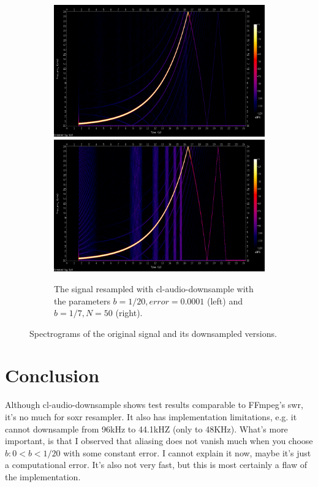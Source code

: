 \documentclass[a4paper,11pt,fleqn]{article}
\begin{document}
\begin{figure}[h!]
  \begin{subfigure}{\linewidth}
  \includegraphics[width=.4\linewidth]{accurate.png}\hfill
  \includegraphics[width=.4\linewidth]{fast.png}\hfill
  \caption{The signal resampled with cl-audio-downsample with the parameters $b=1/20, error=0.0001$ (left) and $b=1/7, N=50$ (right).}
  \end{subfigure}\par\medskip
  \caption{Spectrograms of the original signal and its downsampled versions.}
  \label{spectro}
\end{figure}

\section{Conclusion}
Although cl-audio-downsample shows test results comparable to FFmpeg's swr, it's no much for soxr resampler. It also has implementation limitations, e.g. it cannot downsample from 96kHz to 44.1kHZ (only to 48KHz). What's more
important, is that I observed that aliasing does not vanish much when you choose $b: 0 < b < 1/20$ with some constant error. I cannot explain it now, maybe it's just a computational error. It's also not very fast, but this is
most certainly a flaw of the implementation.
\end{document}
